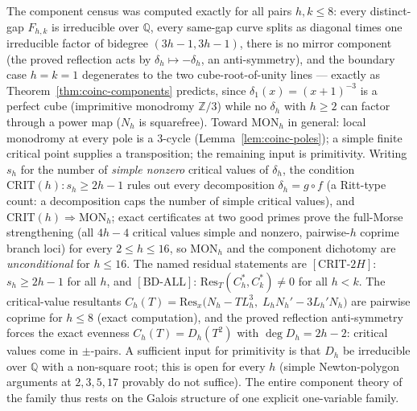 \begin{remark}\label{rem:coinc-mon-status}
The component census was computed exactly for all pairs
$h,k\le8$: every distinct-gap $F_{h,k}$ is irreducible over
$\mathbb Q$, every same-gap curve splits as diagonal times one
irreducible factor of bidegree $(3h{-}1,3h{-}1)$, there is no mirror
component (the proved reflection acts by $\delta_h\mapsto-\delta_h$, an
anti-symmetry), and the boundary case $h=k=1$ degenerates to the two
cube-root-of-unity lines --- exactly as
Theorem~\ref{thm:coinc-components} predicts, since
$\delta_1(x)=(x+1)^{-3}$ is a perfect cube (imprimitive monodromy
$\mathbb Z/3$) while no $\delta_h$ with $h\ge2$ can factor through a
power map ($N_h$ is squarefree).  Toward $\mathrm{MON}_h$ in general:
local monodromy at every pole is a $3$-cycle
(Lemma~\ref{lem:coinc-poles}); a simple finite critical point supplies a
transposition; the remaining input is primitivity.  Writing $s_h$ for
the number of \emph{simple nonzero} critical values of $\delta_h$, the
condition $\mathrm{CRIT}(h)\colon s_h\ge2h-1$ rules out every
decomposition $\delta_h=g\circ f$ (a Ritt-type count: a decomposition
caps the number of simple critical values), and
$\mathrm{CRIT}(h)\Rightarrow\mathrm{MON}_h$; exact certificates at two
good primes prove the full-Morse strengthening (all $4h-4$ critical
values simple and nonzero, pairwise-$h$ coprime branch loci) for every
$2\le h\le16$, so $\mathrm{MON}_h$ and the component dichotomy are
\emph{unconditional} for $h\le16$.  The named residual statements are
$[\mathrm{CRIT}\text{-}2H]$: $s_h\ge2h-1$ for all $h$, and
$[\mathrm{BD}\text{-}\mathrm{ALL}]$:
$\mathrm{Res}_T(C_h^*,C_k^*)\ne0$ for all $h<k$.  The critical-value resultants
$C_h(T)=\mathrm{Res}_x\bigl(N_h-TL_h^3,\;L_hN_h'-3L_h'N_h\bigr)$ are
pairwise coprime for $h\le8$ (exact computation), and the proved
reflection anti-symmetry forces the exact evenness
$C_h(T)=D_h(T^2)$ with $\deg D_h=2h-2$: critical values come in
$\pm$-pairs.  A sufficient input for primitivity is that $D_h$ be
irreducible over $\mathbb Q$ with a non-square root; this is open for
every $h$ (simple Newton-polygon arguments at $2,3,5,17$ provably do
not suffice).  The entire component theory of the family thus rests on
the Galois structure of one explicit one-variable family.
\end{remark}

